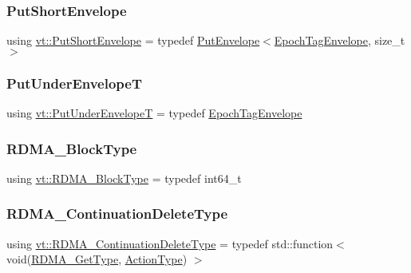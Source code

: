 \subsubsection{\texorpdfstring{Put\+Short\+Envelope}{PutShortEnvelope}}
{\footnotesize\ttfamily using \hyperlink{namespacevt_a4e561211bbf1d8d9a4766eb159852736}{vt\+::\+Put\+Short\+Envelope} = typedef \hyperlink{structvt_1_1_put_envelope}{Put\+Envelope}$<$\hyperlink{namespacevt_af23b58014ced6898422213a0e5e6a27a}{Epoch\+Tag\+Envelope}, size\+\_\+t$>$}

\mbox{\label{namespacevt_a38f077afcffb8ed5e18c6760e6697bbc}} 
\subsubsection{\texorpdfstring{Put\+Under\+EnvelopeT}{PutUnderEnvelopeT}}
{\footnotesize\ttfamily using \hyperlink{namespacevt_a38f077afcffb8ed5e18c6760e6697bbc}{vt\+::\+Put\+Under\+EnvelopeT} = typedef \hyperlink{namespacevt_af23b58014ced6898422213a0e5e6a27a}{Epoch\+Tag\+Envelope}}

\mbox{\label{namespacevt_ae54d2ca8f6bb4d65faf65118c82cd6f7}} 
\subsubsection{\texorpdfstring{R\+D\+M\+A\+\_\+\+Block\+Type}{RDMA\_BlockType}}
{\footnotesize\ttfamily using \hyperlink{namespacevt_ae54d2ca8f6bb4d65faf65118c82cd6f7}{vt\+::\+R\+D\+M\+A\+\_\+\+Block\+Type} = typedef int64\+\_\+t}

\mbox{\label{namespacevt_a4dfad0b5809d9812d60a0311a45ae0c2}} 
\subsubsection{\texorpdfstring{R\+D\+M\+A\+\_\+\+Continuation\+Delete\+Type}{RDMA\_ContinuationDeleteType}}
{\footnotesize\ttfamily using \hyperlink{namespacevt_a4dfad0b5809d9812d60a0311a45ae0c2}{vt\+::\+R\+D\+M\+A\+\_\+\+Continuation\+Delete\+Type} = typedef std\+::function$<$ void(\hyperlink{namespacevt_a1cab7f4860f65a49ad2c042d6240f288}{R\+D\+M\+A\+\_\+\+Get\+Type}, \hyperlink{namespacevt_ae0a5a7b18cc99d7b732cb4d44f46b0f3}{Action\+Type}) $>$}

